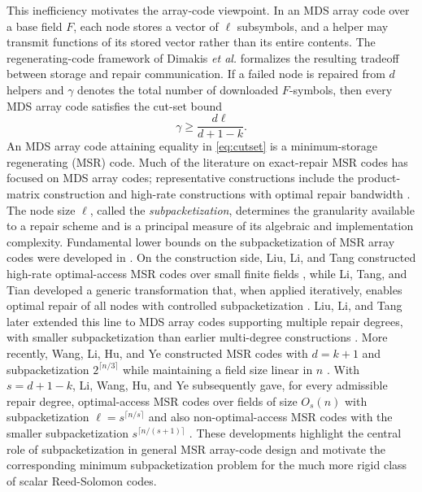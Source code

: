 \documentclass[11pt,onecolumn]{IEEEtran}
\begin{document}
This inefficiency motivates the array-code viewpoint.  In an MDS array
code over a base field $F$, each node stores a vector of $\ell$
subsymbols, and a helper may transmit functions of its stored vector
rather than its entire contents.  The regenerating-code framework of
Dimakis \emph{et al.} \cite{Dimakis2010} formalizes the resulting
tradeoff between storage and repair communication.  If a failed node
is repaired from $d$ helpers and $\gamma$ denotes the total number of
downloaded $F$-symbols, then every MDS array code satisfies the cut-set
bound
\begin{equation}
	\gamma\ge \frac{d\ell}{d+1-k}.
	\label{eq:cutset}
\end{equation}
An MDS array code attaining equality in
\eqref{eq:cutset} is a minimum-storage regenerating (MSR) code.  Much of the literature on
exact-repair MSR codes has focused on MDS array codes; representative
constructions include the product-matrix construction
\cite{RashmiShahKumar2011} and high-rate constructions with optimal
repair bandwidth \cite{YeBarg2017}.  The node size $\ell$, called the
\emph{subpacketization}, determines the granularity available to a
repair scheme and is a principal measure of its algebraic and
implementation complexity.  Fundamental lower bounds on the
subpacketization of MSR array codes were developed in
\cite{GoparajuTamoCalderbank2014,AlrabiahGuruswami2021,
	BalajiVajhaKumar2022}.  On the construction side, Liu, Li, and Tang
constructed high-rate optimal-access MSR codes over small finite fields
\cite{LiuLiTang2018}, while Li, Tang, and Tian developed a generic
transformation that, when applied iteratively, enables optimal repair
of all nodes with controlled subpacketization \cite{LiTangTian2018}.  Liu, Li, and Tang later extended
this line to MDS array codes supporting multiple repair degrees, with
smaller subpacketization than earlier multi-degree constructions
\cite{LiuLiTang2023}.  More recently, Wang, Li, Hu, and Ye constructed
MSR codes with $d=k+1$ and subpacketization $2^{\lceil n/3\rceil}$ while maintaining a
field size linear in $n$ \cite{WangLiHuYe2023}.  With $s=d+1-k$, Li, Wang, Hu, and Ye
subsequently gave, for every admissible repair degree, optimal-access
MSR codes over fields of size $O_s(n)$ with subpacketization
$\ell=s^{\lceil n/s\rceil}$
and also non-optimal-access MSR codes with the smaller subpacketization
$s^{\lceil n/(s+1)\rceil}$ \cite{LiWangHuYe2024}.
These developments highlight the central role of subpacketization in
general MSR array-code design and motivate the corresponding minimum
subpacketization problem for the much more rigid class of scalar
Reed-Solomon codes.
\end{document}
